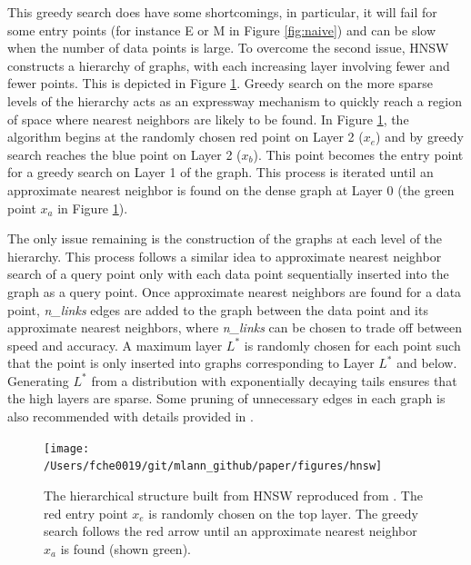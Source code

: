 \documentclass[11pt,a4paper,]{article}
\begin{document}
This greedy search does have some shortcomings, in particular, it will fail for some entry points (for instance E or M in Figure \ref{fig:naive}) and can be slow when the number of data points is large. To overcome the second issue, HNSW constructs a hierarchy of graphs, with each increasing layer involving fewer and fewer points. This is depicted in Figure \ref{fig:hnsw}. Greedy search on the more sparse levels of the hierarchy acts as an expressway mechanism to quickly reach a region of space where nearest neighbors are likely to be found. In Figure \ref{fig:hnsw}, the algorithm begins at the randomly chosen red point on Layer 2 (\(x_e\)) and by greedy search reaches the blue point on Layer 2 (\(x_b\)). This point becomes the entry point for a greedy search on Layer 1 of the graph. This process is iterated until an approximate nearest neighbor is found on the dense graph at Layer 0 (the green point \(x_a\) in Figure \ref{fig:hnsw}).

The only issue remaining is the construction of the graphs at each level of the hierarchy. This process follows a similar idea to approximate nearest neighbor search of a query point only with each data point sequentially inserted into the graph as a query point. Once approximate nearest neighbors are found for a data point, \textit{n\_links} edges are added to the graph between the data point and its approximate nearest neighbors, where \textit{n\_links} can be chosen to trade off between speed and accuracy. A maximum layer \(L^*\) is randomly chosen for each point such that the point is only inserted into graphs corresponding to Layer \(L^*\) and below. Generating \(L^*\) from a distribution with exponentially decaying tails ensures that the high layers are sparse. Some pruning of unnecessary edges in each graph is also recommended with details provided in \textcite{Malkov2020-jp}.



\begin{figure}

{\centering \texttt{[image: /Users/fche0019/git/mlann\_github/paper/figures/hnsw]} 

}

\caption{The hierarchical structure built from HNSW reproduced from \textcite{Malkov2020-jp}. The red entry point \(x_e\) is randomly chosen on the top layer. The greedy search follows the red arrow until an approximate nearest neighbor \(x_a\) is found (shown green).}\label{fig:hnsw}
\end{figure}
\end{document}
